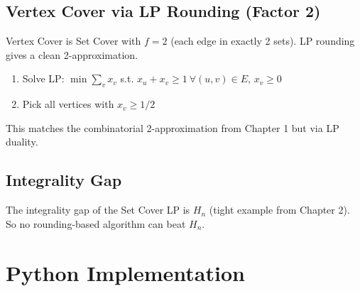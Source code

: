 \subsection{Vertex Cover via LP Rounding (Factor 2)}

Vertex Cover is Set Cover with $f=2$ (each edge in exactly 2 sets). LP rounding gives a clean 2-approximation.

\begin{algorithmdef}
\begin{enumerate}
    \item Solve LP: $\min \sum_v x_v$ s.t. $x_u + x_v \geq 1 \ \forall (u,v) \in E$, $x_v \geq 0$
    \item Pick all vertices with $x_v \geq 1/2$
\end{enumerate}
\end{algorithmdef}

This matches the combinatorial 2-approximation from Chapter 1 but via LP duality.

\subsection{Integrality Gap}

The integrality gap of the Set Cover LP is $H_n$ (tight example from Chapter 2). So no rounding-based algorithm can beat $H_n$.

\section{Python Implementation}

